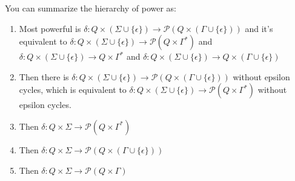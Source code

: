 \documentclass[12pt]{article}
\begin{document}
 You can summarize the hierarchy of power as:
 \begin{enumerate}
 	\item Most powerful is $\delta : Q \times (\Sigma \cup \{\epsilon\})\rightarrow \mathcal{P}(Q \times  (\Gamma \cup \{\epsilon\}))$ and it's equivalent to $\delta : Q \times  (\Sigma \cup \{\epsilon\}) \rightarrow \mathcal{P}(Q \times \Gamma^*)$ and $\delta : Q \times  (\Sigma \cup \{\epsilon\}) \rightarrow Q \times \Gamma^*$ and $\delta : Q \times  (\Sigma \cup \{\epsilon\}) \rightarrow Q \times (\Gamma\cup\{\epsilon \})$
 	\item Then there is $\delta : Q \times (\Sigma \cup \{\epsilon\})\rightarrow \mathcal{P}(Q \times  (\Gamma \cup \{\epsilon\}))$ without epsilon cycles, which is equivalent to $\delta : Q \times (\Sigma \cup \{\epsilon\})\rightarrow \mathcal{P}(Q \times  \Gamma^*)$ without epsilon cycles.
 	\item Then $\delta : Q \times \Sigma \rightarrow \mathcal{P}(Q \times \Gamma^*)$
 	\item Then $\delta : Q \times \Sigma \rightarrow \mathcal{P}(Q \times  (\Gamma \cup \{\epsilon\}))$
 	\item Then $\delta : Q \times \Sigma \rightarrow \mathcal{P}(Q \times  \Gamma)$
 \end{enumerate}
 
\end{document}
